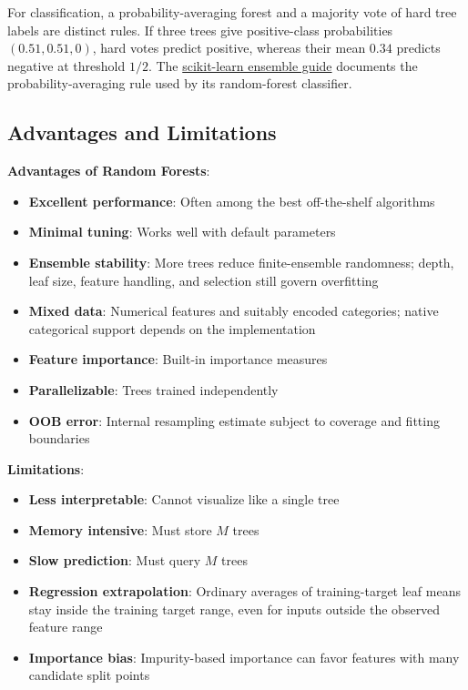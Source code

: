 \documentclass[11pt,twoside]{article}
\numberwithin{equation}{section}
\theoremstyle{plain}
\theoremstyle{definition}
\theoremstyle{remark}
\newenvironment{keyidea}{
  \begin{tcolorbox}[colback=yellow!5!white,
                    colframe=yellow!50!black,
                    title=Key Idea,
                    breakable,
                    enhanced,
                    sharp corners,
                    boxrule=0.8pt,
                    left=6pt, right=6pt, top=6pt, bottom=6pt]
}{
  \end{tcolorbox}
}
\begin{document}
For classification, a probability-averaging forest and a majority vote of hard tree labels are distinct rules. If three trees give positive-class probabilities $(0.51,0.51,0)$, hard votes predict positive, whereas their mean $0.34$ predicts negative at threshold $1/2$. The \href{https://scikit-learn.org/stable/modules/ensemble.html}{scikit-learn ensemble guide} documents the probability-averaging rule used by its random-forest classifier.

\subsection{Advantages and Limitations}

\begin{keyidea}
\textbf{Advantages of Random Forests}:
\begin{itemize}
\item \textbf{Excellent performance}: Often among the best off-the-shelf algorithms
\item \textbf{Minimal tuning}: Works well with default parameters
\item \textbf{Ensemble stability}: More trees reduce finite-ensemble randomness; depth, leaf size, feature handling, and selection still govern overfitting
\item \textbf{Mixed data}: Numerical features and suitably encoded categories; native categorical support depends on the implementation
\item \textbf{Feature importance}: Built-in importance measures
\item \textbf{Parallelizable}: Trees trained independently
\item \textbf{OOB error}: Internal resampling estimate subject to coverage and fitting boundaries
\end{itemize}

\textbf{Limitations}:
\begin{itemize}
\item \textbf{Less interpretable}: Cannot visualize like a single tree
\item \textbf{Memory intensive}: Must store $M$ trees
\item \textbf{Slow prediction}: Must query $M$ trees
\item \textbf{Regression extrapolation}: Ordinary averages of training-target leaf means stay inside the training target range, even for inputs outside the observed feature range
\item \textbf{Importance bias}: Impurity-based importance can favor features with many candidate split points
\end{itemize}


\end{keyidea}
\end{document}
